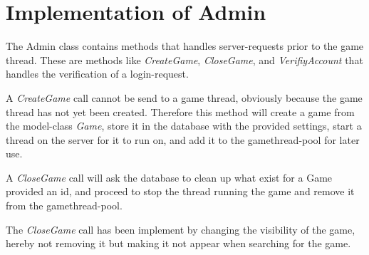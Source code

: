 \section{Implementation of Admin}
\label{sec:adminimpl}

The Admin class contains methods that handles server-requests prior to the game thread. These are methods like \textit{CreateGame}, \textit{CloseGame}, and \textit{VerifiyAccount} that handles the verification of a login-request. 

A \textit{CreateGame} call cannot be send to a game thread, obviously because the game thread has not yet been created. Therefore this method will create a game from the model-class \textit{Game}, store it in the database with the provided settings, start a thread on the server for it to run on, and add it to the gamethread-pool for later use. 

A \textit{CloseGame} call will ask the database to clean up what exist for a Game provided an id, and proceed to stop the thread running the game and remove it from the gamethread-pool.



The \textit{CloseGame} call has been implement by changing the visibility of the game, hereby not removing it but making it not appear when searching for the game. 
